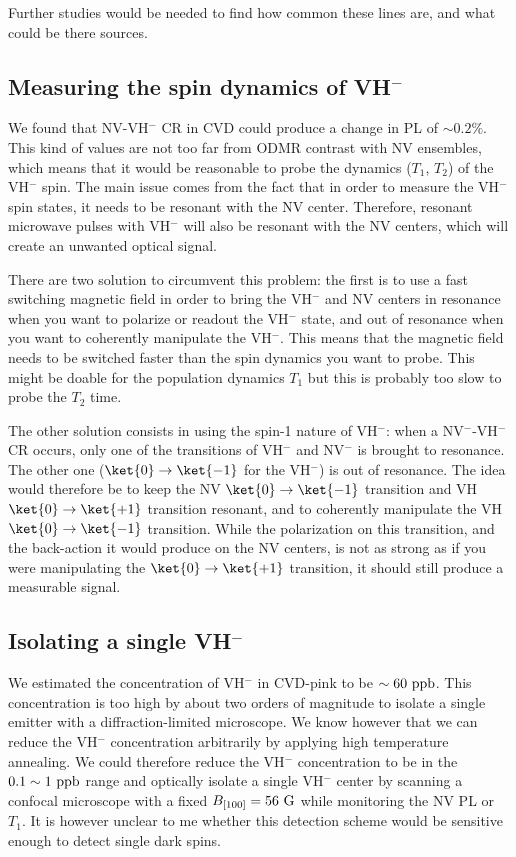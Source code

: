 \documentclass[a4paper,11pt]{report}
\begin{document}
Further studies would be needed to find how common these lines are, and what could be there sources.

\subsection{Measuring the spin dynamics of VH$^-$}

We found that NV-VH$^-$ CR in CVD could produce a change in PL of $\sim 0.2 \%$. This kind of values are not too far from ODMR contrast with NV ensembles, which means that it would be reasonable to probe the dynamics ($T_1$, $T_2$) of the VH$^-$ spin. The main issue comes from the fact that in order to measure the VH$^-$ spin states, it needs to be resonant with the NV center. Therefore, resonant microwave pulses with VH$^-$ will also be resonant with the NV centers, which will create an unwanted optical signal.

There are two solution to circumvent this problem: the first is to use a fast switching magnetic field in order to bring the VH$^-$ and NV centers in resonance when you want to polarize or readout the VH$^-$ state, and out of resonance when you want to coherently manipulate the VH$^-$. This means that the magnetic field needs to be switched faster than the spin dynamics you want to probe. This might be doable for the population dynamics $T_1$ but this is probably too slow to probe the $T_2$ time.

The other solution consists in using the spin-1 nature of VH$^-$: when a NV$^-$-VH$^-$ CR occurs, only one of the transitions of VH$^-$ and NV$^-$ is brought to resonance. The other one ($\ket{0} \to \ket{-1}$ for the VH$^-$) is out of resonance. The idea would therefore be to keep the NV $\ket{0} \to \ket{-1}$ transition and VH $\ket{0} \to \ket{+1}$ transition resonant, and to coherently manipulate the VH $\ket{0} \to \ket{-1}$ transition. While the polarization on this transition, and the back-action it would produce on the NV centers, is not as strong as if you were manipulating the $\ket{0} \to \ket{+1}$ transition, it should still produce a measurable signal.

\subsection{Isolating a single VH$^-$}

We estimated the concentration of VH$^-$ in CVD-pink to be $\sim 60\ \rm ppb$. This concentration is too high by about two orders of magnitude to isolate a single emitter with a diffraction-limited microscope. We know however that we can reduce the VH$^-$ concentration arbitrarily by applying high temperature annealing. We could therefore reduce the VH$^-$ concentration to be in the $0.1 \sim 1\ \rm ppb$ range and optically isolate a single VH$^-$ center by scanning a confocal microscope with a fixed $B_{[100]}=56\ \rm G$ while monitoring the NV PL or $T_1$. It is however unclear to me whether this detection scheme would be sensitive enough to detect single dark spins.

\printbibliography
\end{document}
